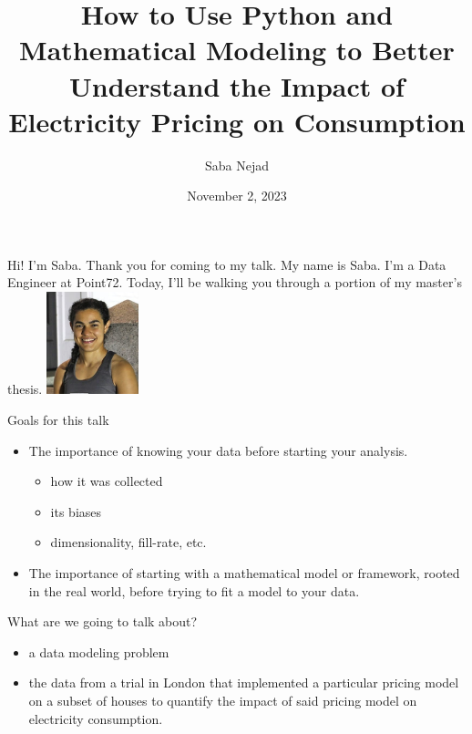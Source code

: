 \documentclass{beamer}
\title{How to Use Python and Mathematical Modeling to Better Understand the Impact of Electricity Pricing on Consumption}
\date{November 2, 2023}
\author{Saba Nejad}
\institute{PyData NYC 2023}
\begin{document}
\maketitle

\begin{frame}{Hi! I'm Saba. Thank you for coming to my talk.}
  \vspace{1cm}
  My name is Saba. I'm a Data Engineer at Point72. Today, I'll be walking you through a portion of my master's thesis.
  \newline
  \newline
  \includegraphics[width=0.2\textwidth]{images/saba-nejad.png}
\end{frame}

\begin{frame}{Goals for this talk}
  \begin{itemize}
  \item<+-> The importance of knowing your data before starting your analysis.
    \begin{itemize}
      \item how it was collected
      \item its biases
      \item dimensionality, fill-rate, etc.\
    \end{itemize}
  \item<+-> The importance of starting with a mathematical model or framework, rooted in the real world, before trying to fit a model to your data.
  \end{itemize}
\end{frame}

\begin{frame}{What are we going to talk about?}
  \begin{itemize}
    \item<+-> a data modeling problem
    \item<+-> the data from a trial in London that implemented a particular pricing model on a subset of houses to quantify the impact of said pricing model on electricity consumption.
  \end{itemize}
\end{frame}
\end{document}
